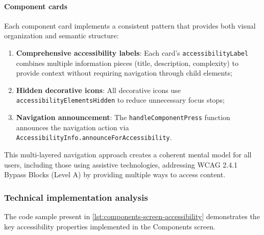\pagebreak

\paragraph{Component cards}

Each component card implements a consistent pattern that provides both visual organization and semantic structure:

\begin{enumerate}
    \item \textbf{Comprehensive accessibility labels}: Each card's \texttt{accessibilityLabel} combines multiple information pieces (title, description, complexity) to provide context without requiring navigation through child elements;
    
    \item \textbf{Hidden decorative icons}: All decorative icons use \texttt{accessibilityElementsHidden} to reduce unnecessary focus stops;
    
    \item \textbf{Navigation announcement}: The \texttt{handleComponentPress} function announces the navigation action via \texttt{AccessibilityInfo.announceForAccessibility}.
\end{enumerate}

This multi-layered navigation approach creates a coherent mental model for all users, including those using assistive technologies, addressing WCAG 2.4.1 Bypass Blocks (Level A) by providing multiple ways to access content.

\subsubsection{Technical implementation analysis}

The code sample present in \ref{lst:components-screen-accessibility} demonstrates the key accessibility properties implemented in the Components screen.

